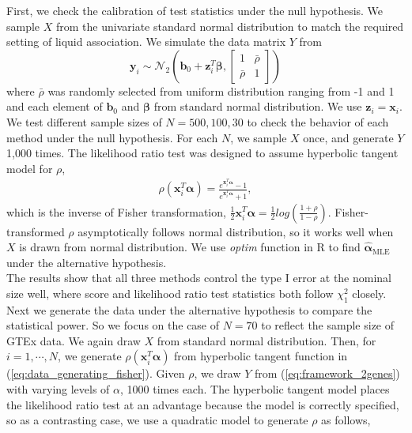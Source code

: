 \documentclass[aap,authoryear, preprint]{imsart}
\numberwithin{equation}{section}
\theoremstyle{plain}
\begin{document}
First, we check the calibration of test statistics under the null hypothesis. We sample $X$ from the univariate standard normal distribution to match the required setting of liquid association. We simulate the data matrix $Y$ from 
$$\bm{y}_i \sim \mathcal{N}_2\left(\bm{b}_0 + \bm{z}_i^T\bm{\beta}, \begin{bmatrix} 1 & \bar{\rho} \\ \bar{\rho} & 1 \end{bmatrix}  \right)$$ 
where $\bar{\rho}$ was randomly selected from uniform distribution ranging from -1 and 1 and each element of $\bm{b}_0$ and $\bm{\beta}$ from standard normal distribution. We use $\bm{z}_i = \bm{x}_i$. We test different sample sizes of $N = 500, 100, 30$ to check the behavior of each method under the null hypothesis. For each $N$, we sample $X$ once, and generate $Y$ 1,000 times. The likelihood ratio test was designed to assume hyperbolic tangent model for $\rho$,
\begin{align}
    \rho(\bm{x}_i^T\bm{\alpha}) = \frac{e^{\bm{x}_i^T\bm{\alpha}}-1}{e^{\bm{x}_i^T\bm{\alpha}}+1},
    \label{eq:data_generating_fisher}
\end{align}
which is the inverse of Fisher transformation, 
$\frac{1}{2} \bm{x}_i^T\bm{\alpha} = \frac{1}{2}log \left(\frac{1+\rho}{1-\rho}\right)$. Fisher-transformed $\rho$ asymptotically follows normal distribution, so it works well when $X$ is drawn from normal distribution. We use \textit{optim} function in R to find $\hat{\bm{\alpha}}_{\text{MLE}}$ under the alternative hypothesis. \\

The results show that all three methods control the type I error at the nominal size well, where score and likelihood ratio test statistics both follow $\chi_1^2$ closely. \\

Next we generate the data under the alternative hypothesis to compare the statistical power. So we focus on the case of $N=70$ to reflect the sample size of GTEx data. We again draw $X$ from standard normal distribution. Then, for $i = 1, \cdots, N$, we generate $\rho(\bm{x}_i^T\bm{\alpha})$ from hyperbolic tangent function in (\ref{eq:data_generating_fisher}). Given $\rho$, we draw $Y$ from (\ref{eq:framework_2genes}) with varying levels of $\alpha$, 1000 times each. The hyperbolic tangent model places the likelihood ratio test at an advantage because the model is correctly specified, so as a contrasting case, we use a quadratic model to generate $\rho$ as follows,
\end{document}
